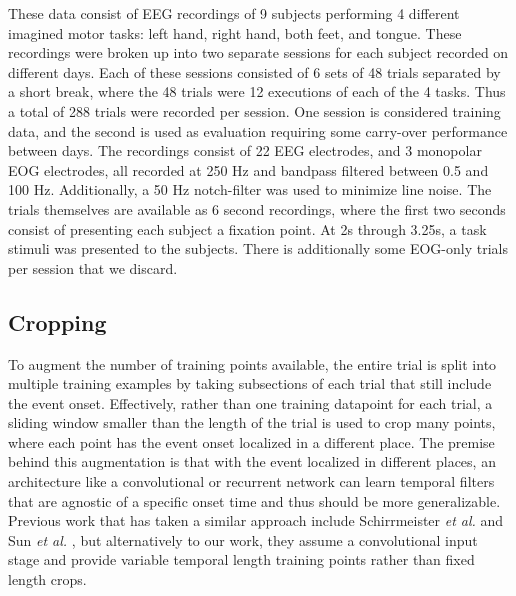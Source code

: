 \documentclass[fleqn,10pt]{wlscirep}
\begin{document}
These data consist of EEG recordings of 9 subjects performing 4 different imagined motor tasks: left hand, right hand, both feet, and tongue. These recordings were broken up into two separate sessions for each subject recorded on different days. Each of these sessions consisted of 6 sets of 48 trials separated by a short break, where the 48 trials were 12 executions of each of the 4 tasks. Thus a total of 288 trials were recorded per session. One session is considered training data, and the second is used as evaluation requiring some carry-over performance between days. The recordings consist of 22 EEG electrodes, and 3 monopolar EOG electrodes, all recorded at 250 Hz and bandpass filtered between 0.5 and 100 Hz. Additionally, a 50 Hz notch-filter was used to minimize line noise. The trials themselves are available as 6 second recordings, where the first two seconds consist of presenting each subject a fixation point. At 2s through 3.25s, a task stimuli was presented to the subjects. There is additionally some EOG-only trials per session that we discard. 



\subsection*{Cropping}

To augment the number of training points available, the entire trial is split into multiple training examples by taking subsections of each trial that still include the event onset. Effectively, rather than one training datapoint for each trial, a sliding window smaller than the length of the trial is used to crop many points, where each point has the event onset localized in a different place. The premise behind this augmentation is that with the event localized in different places, an architecture like a convolutional or recurrent network can learn temporal filters that are agnostic of a specific onset time and thus should be more generalizable. Previous work that has taken a similar approach include Schirrmeister {\em et al.} \cite{Schirrmeister2017} and Sun {\em et al.} \cite{Sun}, but alternatively to our work, they assume a convolutional input stage and provide variable temporal length training points rather than fixed length crops.
\end{document}
